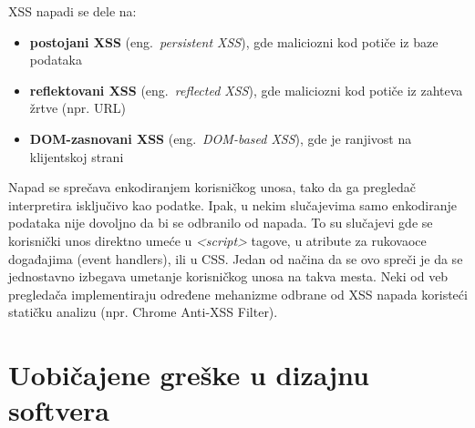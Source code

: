 \documentclass[a4paper]{article}
\begin{document}
XSS napadi se dele na:
\begin{itemize}
\item \textbf{postojani XSS} (eng.~{\em persistent XSS}), gde maliciozni kod potiče iz baze podataka
\item \textbf{reflektovani XSS} (eng.~{\em reflected XSS}), gde maliciozni kod potiče iz zahteva žrtve (npr. URL)
\item \textbf{DOM-zasnovani XSS} (eng.~{\em DOM-based XSS}), gde je ranjivost na klijentskoj strani
\end{itemize}

Napad se sprečava enkodiranjem korisničkog unosa, tako da ga pregledač interpretira isključivo kao podatke. Ipak, u nekim slučajevima samo enkodiranje podataka nije dovoljno da bi se odbranilo od napada. To su slučajevi gde se korisnički unos direktno umeće u \textit{<script>} tagove, u atribute za rukovaoce događajima (event handlers), ili u CSS. Jedan od načina da se ovo spreči je da se jednostavno izbegava umetanje korisničkog unosa na takva mesta. Neki od veb pregledača implementiraju određene mehanizme odbrane od XSS napada koristeći statičku analizu (npr. Chrome Anti-XSS Filter).

\section{Uobičajene greške u dizajnu softvera}
\label{sec:uobicajene greske u dizajnu softvera}
\end{document}
